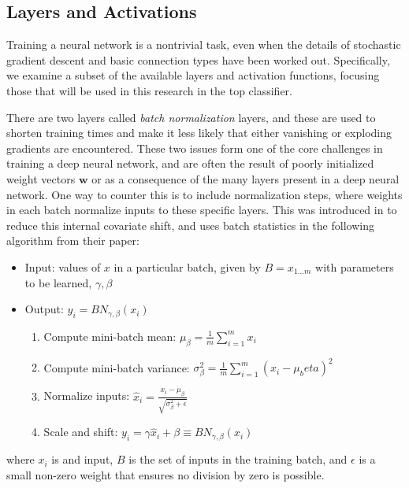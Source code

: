 \subsection{Layers and Activations}
\label{ssec:classifying_layers}

Training a neural network is a nontrivial task, even when the details of stochastic gradient descent and basic connection types have been worked out.
Specifically, we examine a subset of the available layers and activation functions, focusing those that will be used in this research in the top classifier.

There are two layers called \textit{batch normalization} layers, and these are used to shorten training times and make it less likely that either vanishing or exploding gradients are encountered.
These two issues form one of the core challenges in training a deep neural network, and are often the result of poorly initialized weight vectors $\textbf{w}$ or as a consequence of the many layers present in a deep neural network.
One way to counter this is to include normalization steps, where weights in each batch normalize inputs to these specific layers.
This was introduced in \cite{ioffe2015batch} to reduce this internal covariate shift, and uses batch statistics in the following algorithm from their paper:

\begin{itemize}
	\item Input: values of $x$ in a particular batch, given by $B={x_{1\dots m}}$ with parameters to be learned, $\gamma, \beta$
	\item Output: ${y_i=BN_{\gamma,\beta}(x_i)}$
	\begin{enumerate}
		\item Compute mini-batch mean: $\mu_\beta = \frac{1}{m}\sum_{i=1}^{m}x_i$
		\item Compute mini-batch variance: $\sigma_\beta^2 = \frac{1}{m}\sum_{i=1}^{m}(x_i-\mu_beta)^2$
		\item Normalize inputs: $\hat{x}_i = \frac{x_i-\mu_\beta}{\sqrt{\sigma_\beta^2+\epsilon}}$
		\item Scale and shift: $y_i = \gamma\hat{x}_i + \beta \equiv BN_{\gamma,\beta}(x_i)$
	\end{enumerate}
\end{itemize} 

where $x_i$ is and input, $B$ is the set of inputs in the training batch, and $\epsilon$ is a small non-zero weight that ensures no division by zero is possible.


